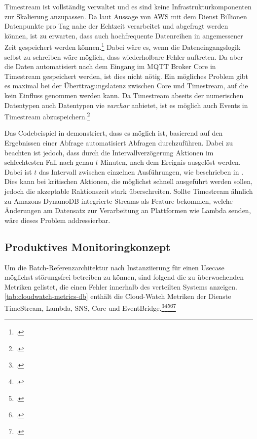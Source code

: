 Timestream ist vollständig verwaltet und es sind keine Infrastrukturkomponenten zur Skalierung anzupassen. Da laut Aussage von \ac{AWS} mit dem Dienst Billionen Datenpunkte pro Tag nahe der Echtzeit verarbeitet und abgefragt werden können, ist zu erwarten, dass auch hochfrequente Datenreihen in angemessener Zeit gespeichert werden können.\footcite[Vgl.][]{AmazonWebServicesInc..2020g} Dabei wäre es, wenn die Dateneingangslogik selbst zu schreiben wäre möglich, dass wiederholbare Fehler auftreten. Da aber die Daten automatisiert nach dem Eingang im \ac{MQTT} Broker \AWSIOT{} Core in Timestream gespeichert werden, ist dies nicht nötig. Ein mögliches Problem gibt es maximal bei der Überttragungslatenz zwischen \AWSIOT{} Core und Timestream, auf die kein Einfluss genommen werden kann.
Da Timestream abseits der numerischen Datentypen auch Datentypen vie \textit{varchar} anbietet, ist es möglich auch Events in Timestream abzuspeichern.\footcite[Vgl.][]{AmazonWebServicesInc..o.J.r}


Das Codebeispiel in  demonstriert, dass es möglich ist, basierend auf den Ergebnissen einer Abfrage automatisiert Abfragen durchzuführen. Dabei zu beachten ist jedoch, dass durch die Intervallverzögerung Aktionen im schlechtesten Fall nach genau $t$ Minuten, nach dem Ereignis ausgelöst werden. Dabei ist $t$ das Intervall zwischen einzelnen Ausführungen, wie beschrieben in . Dies kann bei kritischen Aktionen, die möglichst schnell ausgeführt werden sollen, jedoch die akzeptable Raktionszeit stark überschreiten. Sollte Timestream ähnlich zu Amazons DynamoDB integrierte Streams als Feature bekommen, welche Änderungen am Datensatz zur Verarbeitung an Plattformen wie Lambda senden, wäre dieses Problem addressierbar.

\subsection{Produktives Monitoringkonzept}
Um die Batch-Referenzarchitektur nach Instanziierung für einen Usecase möglichst störungsfrei betreiben zu können, sind folgend die zu überwachenden Metriken gelistet, die einen Fehler innerhalb des verteilten Systems anzeigen. \autoref{tab:cloudwatch-metrics-db} enthält die Cloud-Watch Metriken der Dienste TimeStream, Lambda, \ac{SNS}, \AWSIOT{} Core und EventBridge.\footcite[Vgl.][]{AmazonWebServicesInc..o.J.be}\nzitat\footcite[Vgl.][]{AmazonWebServicesInc..o.J.bf}\nzitat\footcite[Vgl.][]{AmazonWebServicesInc..o.J.bc}\nzitat\footcite[Vgl.][]{AmazonWebServicesInc..o.J.az}\nzitat\footcite[Vgl.][]{AmazonWebServicesInc..o.J.bl}


